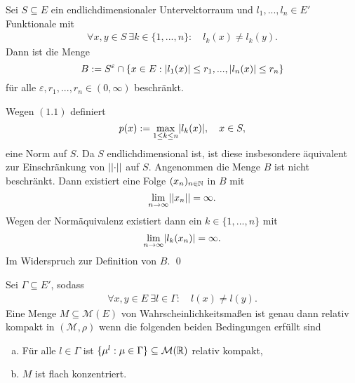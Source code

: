 \begin{lemma}
    Sei $S \subseteq E$ ein endlichdimensionaler Untervektorraum und $l_1,...,l_n \in E'$ Funktionale mit 
    \begin{align}
        \forall x,y \in S \ \exists k \in \{1,...,n\}: \quad l_k(x) \neq l_k(y).
    \end{align}
    Dann ist die Menge 
    $$
        B := S^{\varepsilon} \cap \{x \in E: \lvert l_1(x) \rvert \leq r_1,...,\lvert l_n(x) \rvert\leq r_n\}
    $$
    für alle $\varepsilon, r_1,...,r_n \in (0, \infty)$ beschränkt. 
\end{lemma}

\begin{proof*}
    Wegen $(1.1)$ definiert 
    $$
        p(x) := \max_{1\leq k \leq n} \lvert l_k(x) \rvert, \quad x \in S,
    $$
    eine Norm auf $S$. Da $S$ endlichdimensional ist, ist diese insbesondere äquivalent zur Einschränkung von $\lvert \lvert \cdot \rvert \rvert$ auf $S$. 
    Angenommen die Menge $B$ ist nicht beschränkt. Dann existiert eine Folge $(x_n)_{n \in \mathbb{N}}$ in $B$ mit 
    $$
        \lim_{n \to \infty} \lvert \lvert x_n \rvert \rvert = \infty. 
    $$
    Wegen der Normäquivalenz existiert dann ein $k \in \{1,...,n\}$ mit 
    $$
        \lim_{n \to \infty}\lvert l_k(x_n) \rvert = \infty. 
    $$
    Im Widerspruch zur Definition von $B$. \qed
\end{proof*}

\begin{theorem}
    Sei $\Gamma \subseteq E'$, sodass 
    \begin{align}
        \forall x,y \in E \ \exists l \in \Gamma: \quad l(x) \neq l(y).
    \end{align}
    Eine Menge $M \subseteq \mathcal{M}(E)$ von Wahrscheinlichkeitsmaßen ist genau dann relativ kompakt in $(\mathcal{M}, \rho)$ wenn die folgenden beiden Bedingungen erfüllt sind
    \begin{enumerate}[(a)]
        \item Für alle $l \in \Gamma$ ist $\{\mu^l : \mu \in \Gamma\} \subseteq \mathcal{M}(\mathbb{R})$ relativ kompakt,
        \item $M$ ist flach konzentriert. 
    \end{enumerate}
\end{theorem}

